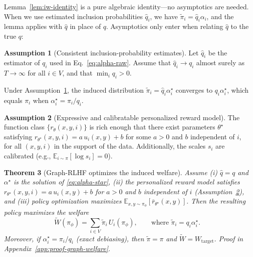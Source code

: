 \documentclass{article}
\theoremstyle{plain}
\newtheorem{theorem}{Theorem}[section]
\theoremstyle{definition}
\newtheorem{assumption}[theorem]{Assumption}
\theoremstyle{remark}
\begin{document}
Lemma~\ref{lem:iw-identity} is a pure algebraic identity---no asymptotics
are needed. When we use estimated inclusion probabilities $\hat q_i$, we
have $\tilde\pi_i = \hat q_i \alpha_i$, and the lemma applies with $\hat q$
in place of $q$. Asymptotics only enter when relating $\hat q$ to the true
$q$:

\begin{assumption}[Consistent inclusion-probability estimates]
\label{ass:qhat}
Let $\hat q_i$ be the estimator of $q_i$ used in Eq.~\eqref{eq:alpha-raw}.
Assume that $\hat q_i \to q_i$ almost surely as $T \to \infty$ for all
$i \in V$, and that $\min_i q_i > 0$.
\end{assumption}

Under Assumption~\ref{ass:qhat}, the induced distribution
$\tilde\pi_i = \hat q_i \alpha_i^\star$ converges to
$q_i \alpha_i^\star$, which equals $\pi_i$ when $\alpha_i^\star = \pi_i / q_i$.

\begin{assumption}[Expressive and calibratable personalized reward model]
\label{ass:expressive}
The function class $\{r_\theta(x,y,i)\}$ is rich enough that there exist
parameters $\theta^\star$ satisfying
$r_{\theta^\star}(x,y,i) = a \, u_i(x,y) + b$ for some $a > 0$ and $b$
independent of $i$, for all $(x,y,i)$ in the support of the data.
Additionally, the scales $s_i$ are calibrated (e.g., $\mathbb{E}_{i \sim \pi}[\log s_i] = 0$).
\end{assumption}

\begin{theorem}[Graph-RLHF optimizes the induced welfare]
\label{thm:graph-welfare}
Assume (i) $\hat q = q$ and $\alpha^\star$ is the solution of
\eqref{eq:alpha-star}, (ii) the personalized reward model satisfies
$r_{\theta^\star}(x,y,i) = a \, u_i(x,y) + b$ for $a > 0$ and $b$ independent
of $i$ (Assumption~\ref{ass:expressive}), and (iii) policy optimization
maximizes $\mathbb{E}_{x,y \sim \pi_\phi}[\bar r_{\theta^\star}(x,y)]$.
Then the resulting policy maximizes the welfare
\begin{equation}
    \widetilde{W}(\pi_\phi)
    =
    \sum_{i \in V} \tilde\pi_i \, U_i(\pi_\phi),
    \qquad\text{where } \tilde\pi_i = q_i \alpha_i^\star.
    \label{eq:induced-welfare}
\end{equation}
Moreover, if $\alpha_i^\star = \pi_i / q_i$ (exact debiasing), then
$\tilde\pi = \pi$ and $\widetilde{W} = W_{\text{target}}$. Proof in Appendix~\ref{app:proof-graph-welfare}.
\end{theorem}
\end{document}
